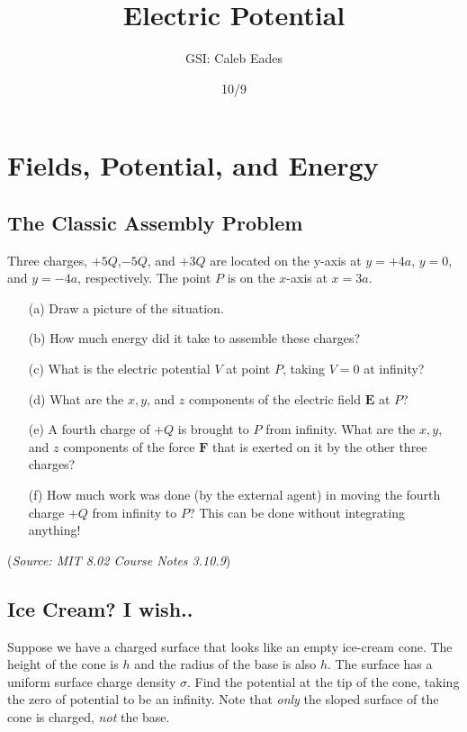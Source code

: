 \documentclass{article}
\begin{document}
\title{Electric Potential}
\author{GSI: Caleb Eades}
\date{10/9}
\maketitle

\section{Fields, Potential, and Energy}

\subsection{The Classic Assembly Problem}

Three charges, $+5Q$,$-5Q$, and $+3Q$ are located on the y-axis at $y= +4a$, $y= 0$, and $y=-4a$, respectively. The point $P$ is on the $x$-axis at $x=3a$.
\begin{itemize}
	\item[(a)] Draw a picture of the situation.
	\item[(b)] How much energy did it take to assemble these charges?
	\item[(c)] What is the electric potential $V$ at point $P$, taking $V= 0$ at infinity?
	\item[(d)] What are the $x,y$, and $z$ components of the electric field $\mathbf{E}$ at $P$?
	\item[(e)] A fourth charge of $+Q$ is brought to $P$ from infinity. What are the $x,y$, and $z$ components of the force $\mathbf{F}$ that is exerted on it by the other three charges?
	\item[(f)] How much work was done (by the external agent) in moving the fourth charge $+Q$ from infinity to $P$? This can be done without integrating anything!
\end{itemize}

(\textit{Source: MIT 8.02 Course Notes 3.10.9})

\subsection{Ice Cream? I wish..}

Suppose we have a charged surface that looks like an empty ice-cream cone. The height of the cone is $h$ and the radius of the base is also $h$. The surface has a uniform surface charge density $\sigma$. Find the potential at the tip of the cone, taking the zero of potential to be an infinity. Note that \textit{only} the sloped surface of the cone is charged, \textit{not} the base.
\end{document}
